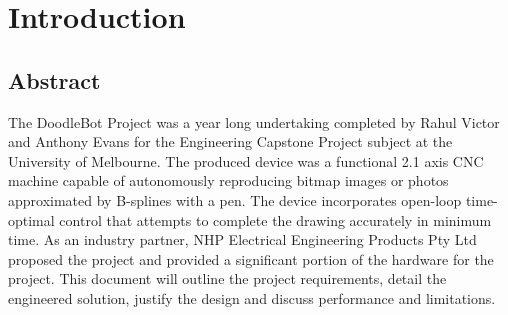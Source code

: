 
\chapter{Introduction}
\label{ch:intro}




\section{Abstract}
The DoodleBot Project was a year long undertaking completed by Rahul Victor and Anthony Evans for the  Engineering Capstone Project subject at the University of Melbourne. The produced device was a functional 2.1 axis CNC machine capable of autonomously reproducing bitmap images or photos approximated by B-splines with a pen. The device incorporates open-loop time-optimal control that attempts to complete the drawing accurately in minimum time. As an industry partner, NHP Electrical Engineering Products Pty Ltd proposed the project and provided a significant portion of the hardware for the project. This document will outline the project requirements, detail the engineered solution, justify the design and discuss performance and limitations. 

